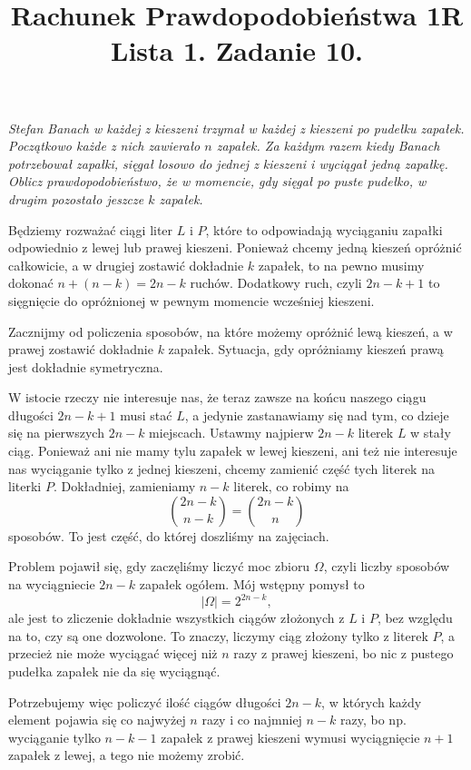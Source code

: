 \documentclass{article}
\title{Rachunek Prawdopodobieństwa 1R\smallskip\\ {\normalsize Lista 1. Zadanie 10.}}
\author{}
\date{}
\begin{document}
\maketitle

\begin{center}
\emph{Stefan Banach w każdej z kieszeni trzymał w każdej z kieszeni po pudełku zapałek. Początkowo każde z nich zawierało $n$ zapałek. Za każdym razem kiedy Banach potrzebował zapałki, sięgał losowo do jednej z kieszeni i wyciągał jedną zapałkę. Oblicz prawdopodobieństwo, że w momencie, gdy sięgał po puste pudełko, w drugim pozostało jeszcze $k$ zapałek.}
\end{center}
\medskip

\medskip

Będziemy rozważać ciągi liter $L$ i $P$, które to odpowiadają wyciąganiu zapałki odpowiednio z lewej lub prawej kieszeni. Ponieważ chcemy jedną kieszeń opróżnić całkowicie, a w drugiej zostawić dokładnie $k$ zapałek, to na pewno musimy dokonać $n+(n-k)=2n-k$ ruchów. Dodatkowy ruch, czyli $2n-k+1$ to sięgnięcie do opróżnionej w pewnym momencie wcześniej kieszeni.
\medskip

Zacznijmy od policzenia sposobów, na które możemy opróżnić lewą kieszeń, a w prawej zostawić dokładnie $k$ zapałek. Sytuacja, gdy opróżniamy kieszeń prawą jest dokładnie symetryczna.

W istocie rzeczy nie interesuje nas, że teraz zawsze na końcu naszego ciągu długości $2n-k+1$ musi stać $L$, a jedynie zastanawiamy się nad tym, co dzieje się na pierwszych $2n-k$ miejscach. Ustawmy najpierw $2n-k$ literek $L$ w stały ciąg. Ponieważ ani nie mamy tylu zapałek w lewej kieszeni, ani też nie interesuje nas wyciąganie tylko z jednej kieszeni, chcemy zamienić część tych literek na literki $P$. Dokładniej, zamieniamy $n-k$ literek, co robimy na 
$${2n-k\choose n-k}={2n-k\choose n}$$
sposobów. To jest część, do której doszliśmy na zajęciach.
\medskip

Problem pojawił się, gdy zaczęliśmy liczyć moc zbioru $\Omega$, czyli liczby sposobów na wyciągniecie $2n-k$ zapałek ogółem. Mój wstępny pomysł to
$$|\Omega|=2^{2n-k},$$
ale jest to zliczenie dokładnie wszystkich ciągów złożonych z $L$ i $P$, bez względu na to, czy są one dozwolone. To znaczy, liczymy ciąg złożony tylko z literek $P$, a przecież nie może wyciągać więcej niż $n$ razy z prawej kieszeni, bo nic z pustego pudełka zapałek nie da się wyciągnąć.

Potrzebujemy więc policzyć ilość ciągów długości $2n-k$, w których każdy element pojawia się co najwyżej $n$ razy i co najmniej $n-k$ razy, bo np. wyciąganie tylko $n-k-1$ zapałek z prawej kieszeni wymusi wyciągnięcie $n+1$ zapałek z lewej, a tego nie możemy zrobić.
\end{document}
